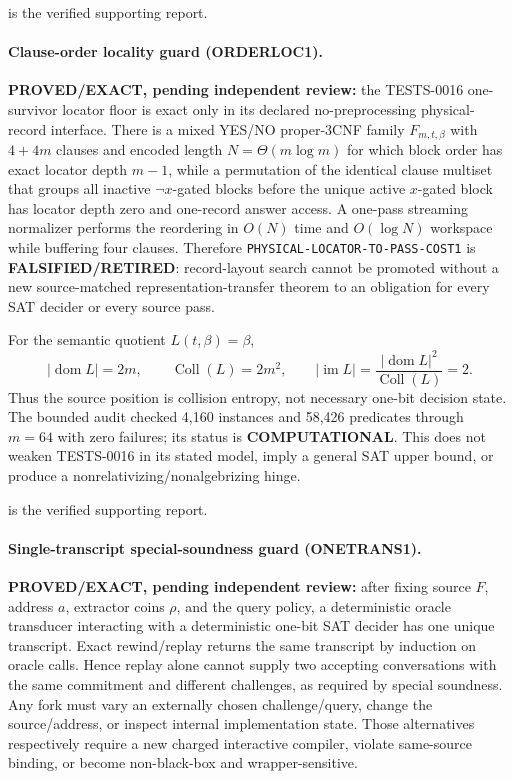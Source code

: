 \documentclass[11pt]{article}
\begin{document}
 is the verified supporting report.

\paragraph{Clause-order locality guard (ORDERLOC1).}
\textbf{PROVED/EXACT, pending independent review:} the TESTS-0016 one-survivor locator floor is exact only in its declared no-preprocessing physical-record interface.  There is a mixed YES/NO proper-$3$CNF family $F_{m,t,\beta}$ with $4+4m$ clauses and encoded length $N=\Theta(m\log m)$ for which block order has exact locator depth $m-1$, while a permutation of the identical clause multiset that groups all inactive $\neg x$-gated blocks before the unique active $x$-gated block has locator depth zero and one-record answer access.  A one-pass streaming normalizer performs the reordering in $O(N)$ time and $O(\log N)$ workspace while buffering four clauses.  Therefore \texttt{PHYSICAL-LOCATOR-TO-PASS-COST1} is \textbf{FALSIFIED/RETIRED}: record-layout search cannot be promoted without a new source-matched representation-transfer theorem to an obligation for every SAT decider or every source pass.

For the semantic quotient $L(t,\beta)=\beta$,
\[
 |\operatorname{dom}L|=2m,\qquad
 \operatorname{Coll}(L)=2m^2,\qquad
 |\operatorname{im}L|=\frac{|\operatorname{dom}L|^2}{\operatorname{Coll}(L)}=2.
\]
Thus the source position is collision entropy, not necessary one-bit decision state.  The bounded audit checked 4,160 instances and 58,426 predicates through $m=64$ with zero failures; its status is \textbf{COMPUTATIONAL}.  This does not weaken TESTS-0016 in its stated model, imply a general SAT upper bound, or produce a nonrelativizing/nonalgebrizing hinge.

 is the verified supporting report.

\paragraph{Single-transcript special-soundness guard (ONETRANS1).}
\textbf{PROVED/EXACT, pending independent review:} after fixing source \(F\),
address \(a\), extractor coins \(\rho\), and the query policy, a deterministic
oracle transducer interacting with a deterministic one-bit SAT decider has one
unique transcript.  Exact rewind/replay returns the same transcript by induction
on oracle calls.  Hence replay alone cannot supply two accepting conversations
with the same commitment and different challenges, as required by special
soundness.  Any fork must vary an externally chosen challenge/query, change the
source/address, or inspect internal implementation state.  Those alternatives
respectively require a new charged interactive compiler, violate same-source
binding, or become non-black-box and wrapper-sensitive.
\end{document}
